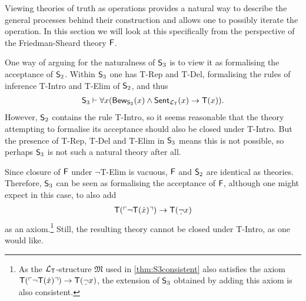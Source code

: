 \documentclass[UKenglish,cleveref,DIV=12]{scrartcl}
\theoremstyle{definition}
\theoremstyle{definition}
\begin{document}
Viewing theories of truth as operations provides a natural way to describe the
general processes behind their construction and allows one to possibly iterate
the operation. In this section we will look at this specifically from the
perspective of the Friedman-Sheard theory $\mathsf{F}$.%

One way of arguing for the naturalness of $\mathsf{S}_3$ is to view it as formalising the acceptance of $\mathsf{S}_2$. Within $\mathsf{S}_3$ one has T-Rep and T-Del, formalising the rules of inference T-Intro and T-Elim of $\mathsf{S}_2$, and thus
\begin{align*}
  \mathsf{S}_3\vdash
  \forall x( \mathsf{Bew}_{\mathsf{S}_2}(x)\land\mathsf{Sent}_{\mathcal{L}_{\mathsf{T}}}(x)\rightarrow \mathsf{T}(x)).
\end{align*}
However, $\mathsf{S}_2$ contains the rule T-Intro, so it seems reasonable that the theory attempting to formalise its acceptance should also be closed under T-Intro. But the presence of T-Rep, T-Del and T-Elim in $\mathsf{S}_3$ means this is not possible, so perhaps $\mathsf{S}_3$ is not such a natural theory after all.

Since closure of $\mathsf{F}$ under $\lnot$T-Elim is vacuous, $\mathsf{F}$ and $\mathsf{S}_2$ are identical as theories. Therefore, $\mathsf{S}_3$ can be seen as formalising the acceptance of $\mathsf{F}$, although one might expect in this case, to also add
\begin{align*}%
  \T(\gn{\lnot \T(\dot x)})\rightarrow \T(\dlnot x)
\end{align*}
as an axiom.\footnote{As the $\mathcal{L}_{\mathsf{T}}$-structure $\mathfrak{M}$ used in \cref{thm:S3consistent} also satisfies the axiom $\T(\gn{\lnot \T(\dot x)})\rightarrow \T(\dlnot x)$, the extension of $\mathsf{S}_3$ obtained by adding this axiom is also consistent.} Still, the resulting theory cannot be closed under T-Intro, as one would like.
\end{document}
